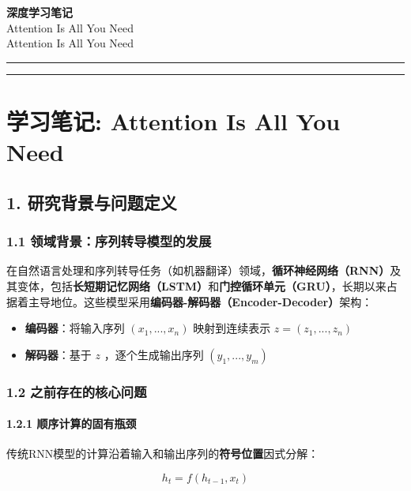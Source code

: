 \documentclass[11pt,a4paper]{article}
\begin{document}
\begin{center}
{\LARGE\bfseries 深度学习笔记}\\[0.5em]
{\large Attention Is All You Need}\\[0.3em]
{\normalsize Attention Is All You Need}
\end{center}

\vspace{1em}
\noindent\rule{\textwidth}{0.4pt}
\tableofcontents
\noindent\rule{\textwidth}{0.4pt}
\vspace{1em}

\section*{学习笔记: Attention Is All You Need}

\subsection*{1. 研究背景与问题定义}

\subsubsection*{1.1 领域背景：序列转导模型的发展}

在自然语言处理和序列转导任务（如机器翻译）领域，\textbf{循环神经网络（RNN）}及其变体，包括\textbf{长短期记忆网络（LSTM）}和\textbf{门控循环单元（GRU）}，长期以来占据着主导地位。这些模型采用\textbf{编码器-解码器（Encoder-Decoder）}架构：

\begin{itemize}
  \item \textbf{编码器}：将输入序列 $(x_1, ..., x_n)$ 映射到连续表示 $z = (z_1, ..., z_n)$
  \item \textbf{解码器}：基于 $z$ ，逐个生成输出序列 $(y_1, ..., y_m)$
\end{itemize}

\subsubsection*{1.2 之前存在的核心问题}

\paragraph{1.2.1 顺序计算的固有瓶颈}

传统RNN模型的计算沿着输入和输出序列的\textbf{符号位置}因式分解：

\[
h_t = f(h_{t-1}, x_t)
\]
\end{document}
